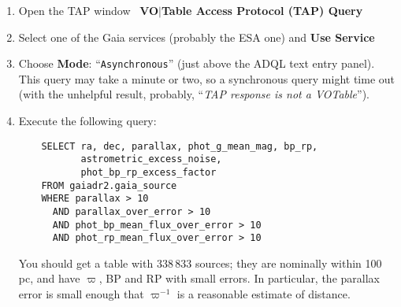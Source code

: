 \documentclass{article}
\newcommand{\buttimg}[1]
           {\mbox{\vtop{\vskip-2ex\hbox{\texttt{[image: \#1]}}}}}
\newcommand{\lab}[1]{{\bf #1}}
\newcommand{\mb}[3]{\buttimg{#1}~\lab{#2}$\mid$\lab{#3}}
\newcommand{\entry}[2]{\lab{#1}: ``{\tt #2}''}
\begin{document}
\begin{minipage}[t]{11cm}
  \raggedright
  \begin{enumerate}
  \item Open the TAP window
        \mb{tap_button.png}{VO}{Table Access Protocol (TAP) Query}
  \item Select one of the Gaia services (probably the ESA one)
        and \lab{Use Service}
  \item Choose \entry{Mode}{Asynchronous}
        (just above the ADQL text entry panel).
        This query may take a minute or two,
        so a synchronous query might time out
        (with the unhelpful result, probably,
         ``{\em TAP response is not a VOTable}'').
  \item Execute the following query:
\label{step:hrd-data}
    \begin{verbatim}
    SELECT ra, dec, parallax, phot_g_mean_mag, bp_rp,
           astrometric_excess_noise,
           phot_bp_rp_excess_factor
    FROM gaiadr2.gaia_source
    WHERE parallax > 10
      AND parallax_over_error > 10
      AND phot_bp_mean_flux_over_error > 10
      AND phot_rp_mean_flux_over_error > 10
    \end{verbatim}
    \vspace*{-3ex}
    You should get a table with 338\,833 sources;
    they are nominally within 100\,pc, and have $\varpi$, BP and RP
    with small errors.  In particular, the parallax error is small enough
    that $\varpi^{-1}$ is a reasonable estimate of distance.
  \end{enumerate}
\end{minipage}
\end{document}
